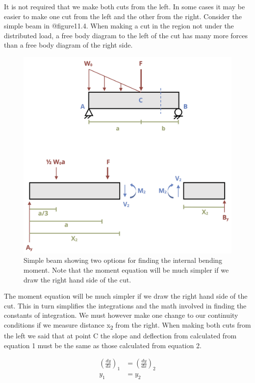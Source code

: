 \documentclass[
  letterpaper,
  DIV=11,
  numbers=noendperiod]{scrreprt}
\begin{document}
It is not required that we make both cuts from the left. In some cases
it may be easier to make one cut from the left and the other from the
right. Consider the simple beam in @figure11.4. When making a cut in the
region not under the distributed load, a free body diagram to the left
of the cut has many more forces than a free body diagram of the right
side.

\begin{figure}

{\centering \includegraphics[width=4.66667in,height=\textheight]{images/CH11 PNGs/11.4.png}

}

\caption{Simple beam showing two options for finding the internal
bending moment. Note that the moment equation will be much simpler if we
draw the right hand side of the cut.}

\end{figure}%

The moment equation will be much simpler if we draw the right hand side
of the cut. This in turn simplifies the integrations and the math
involved in finding the constants of integration. We must however make
one change to our continuity conditions if we measure distance
x\textsubscript{2} from the right. When making both cuts from the left
we said that at point C the slope and deflection from calculated from
equation 1 must be the same as those calculated from equation 2.

\[
\begin{aligned}
\left(\frac{d y}{d x}\right)_{1} & =\left(\frac{d y}{d x}\right)_{2} \\
y_{1} & =y_{2}
\end{aligned}
\]
\end{document}
